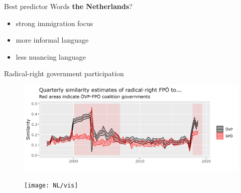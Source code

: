 \documentclass{beamer}
\begin{document}
\begin{frame}[allowframebreaks]{Best predictor Words}
 \textbf{the Netherlands}?
\begin{itemize}
    \item strong immigration focus
    \item more informal language
    \item less nuancing language
\end{itemize}

\end{frame}

\begin{frame}[allowframebreaks]{Radical-right government participation}
\begin{figure}
    \centering
    \includegraphics[width = \textwidth]{AT/vis/AT_fp_paper.png}
\end{figure}

\begin{figure}
        \centering
        \texttt{[image: NL/vis]}
\end{figure}
\end{frame}
\end{document}
